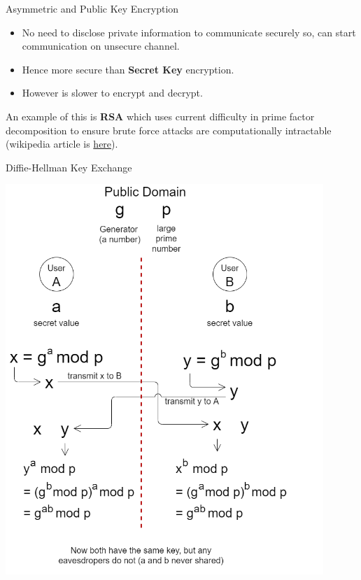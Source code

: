 \begin{definitionbox}{Asymmetric and Public Key Encryption}
    \begin{itemize}
        \setlength\itemsep{0em}
        \item No need to disclose private information to communicate securely so, can start communication on unsecure channel.
        \item Hence more secure than \textbf{Secret Key} encryption.
        \item However is slower to encrypt and decrypt.
    \end{itemize}
    An example of this is \textbf{RSA} which uses current difficulty in prime factor decomposition to ensure brute force attacks are computationally intractable (wikipedia article is \href{https://en.wikipedia.org/wiki/RSA_(cryptosystem)}{here}).
\end{definitionbox}
\begin{definitionbox}{Diffie-Hellman Key Exchange}
    \begin{center}\includegraphics[width=0.9\textwidth]{network_security/images/diffie hellman key exchange.png}\end{center}
\end{definitionbox}
